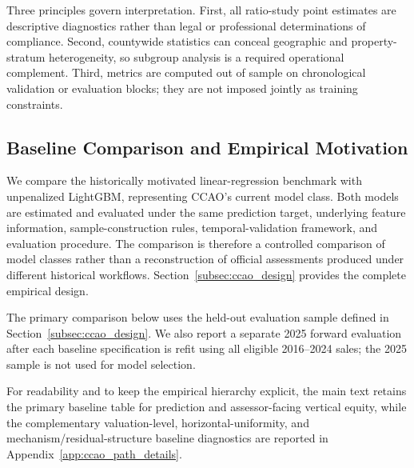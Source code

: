 \documentclass[10pt]{article}
\theoremstyle{definition}
\newcommand{\1}{\mathbf{1}}
\begin{document}
Three principles govern interpretation. First, all ratio-study point estimates are descriptive diagnostics rather than legal or professional determinations of compliance. Second, countywide statistics can conceal geographic and property-stratum heterogeneity, so subgroup analysis is a required operational complement. Third, metrics are computed out of sample on chronological validation or evaluation blocks; they are not imposed jointly as training constraints.

\subsection{Baseline Comparison and Empirical Motivation}
\label{subsec:baseline_tension}


{We compare the historically motivated linear-regression benchmark with unpenalized LightGBM, representing CCAO's current model class.} Both models are estimated and evaluated under the same prediction target,
underlying feature information, sample-construction rules, temporal-validation
framework, and evaluation procedure. The comparison is therefore a controlled
comparison of model classes rather than a reconstruction of official
assessments produced under different historical workflows.
Section~\ref{subsec:ccao_design} provides the complete empirical design.

{The primary comparison below uses the held-out evaluation sample defined in Section~\ref{subsec:ccao_design}. We also report a separate 2025 forward evaluation after each baseline specification is refit using all eligible 2016--2024 sales; the 2025 sample is not used for model selection.}


For readability and to keep the empirical hierarchy explicit, the main text retains the primary baseline table for prediction and assessor-facing vertical equity, while the complementary valuation-level, horizontal-uniformity, and mechanism/residual-structure baseline diagnostics are reported in Appendix~\ref{app:ccao_path_details}.
\end{document}
